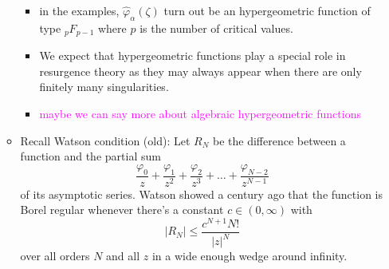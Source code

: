 \documentclass{article}
\theoremstyle{definition}
\begin{document}
\begin{itemize}
\begin{itemize}
\begin{itemize}
\item in the examples, $\hat{\varphi}_\alpha(\zeta)$ turn out be an hypergeometric function of type ${}_pF_{p-1}$ where $p$ is the number of critical values. 
\item We expect that hypergeometric functions play a special role in resurgence theory as they may always appear when there are only finitely many singularities.
\item \textcolor{magenta}{maybe we can say more about algebraic hypergeometric functions}
\end{itemize}
\item Recall Watson condition (old): Let $R_N$ be the difference between a function and the partial sum
\[ \frac{\varphi_0}{z} + \frac{\varphi_1}{z^2} + \frac{\varphi_2}{z^3} + \ldots + \frac{\varphi_{N-2}}{z^{N-1}} \]
of its asymptotic series. Watson showed a century ago that the function is Borel regular whenever there's a constant $c \in (0, \infty)$ with
\[ |R_N| \le \frac{c^{N+1} N!}{|z|^N} \]
over all orders $N$ and all $z$ in a wide enough wedge around infinity.
\end{itemize}
\end{itemize}
\end{document}

